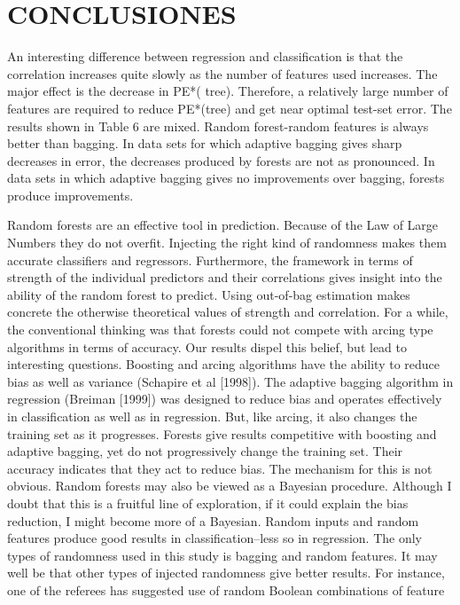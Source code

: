 \section{CONCLUSIONES}
An interesting difference between regression and classification is that the
correlation increases quite slowly as the number of features used increases. The
major effect is the decrease in PE*( tree). Therefore, a relatively large number of
features are required to reduce PE*(tree) and get near optimal test-set error.
The results shown in Table 6 are mixed. Random forest-random features is
always better than bagging. In data sets for which adaptive bagging gives sharp
decreases in error, the decreases produced by forests are not as pronounced. In
data sets in which adaptive bagging gives no improvements over bagging,
forests produce improvements.


Random forests are an effective tool in prediction. Because of the Law of Large
Numbers they do not overfit. Injecting the right kind of randomness makes
them accurate classifiers and regressors. Furthermore, the framework in terms
of strength of the individual predictors and their correlations gives insight into
the ability of the random forest to predict. Using out-of-bag estimation makes
concrete the otherwise theoretical values of strength and correlation.
For a while, the conventional thinking was that forests could not compete with
arcing type algorithms in terms of accuracy. Our results dispel this belief, but
lead to interesting questions. Boosting and arcing algorithms have the ability to
reduce bias as well as variance (Schapire et al [1998]). The adaptive bagging
algorithm in regression (Breiman [1999]) was designed to reduce bias and
operates effectively in classification as well as in regression. But, like arcing, it
also changes the training set as it progresses.
Forests give results competitive with boosting and adaptive bagging, yet do not
progressively change the training set. Their accuracy indicates that they act to
reduce bias. The mechanism for this is not obvious. Random forests may also
be viewed as a Bayesian procedure. Although I doubt that this is a fruitful line
of exploration, if it could explain the bias reduction, I might become more of a
Bayesian.
Random inputs and random features produce good results in classification--less
so in regression. The only types of randomness used in this study is bagging and
random features. It may well be that other types of injected randomness give
better results. For instance, one of the referees has suggested use of random
Boolean combinations of feature
